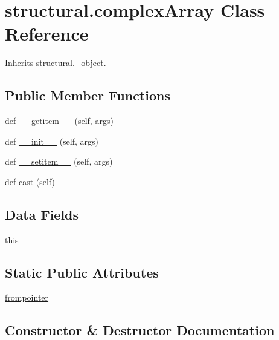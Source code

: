 \hypertarget{classstructural_1_1complex_array}{}\section{structural.\+complex\+Array Class Reference}
\label{classstructural_1_1complex_array}


Inherits \hyperlink{classstructural_1_1__object}{structural.\+\_\+object}.

\subsection*{Public Member Functions}
\begin{DoxyCompactItemize}
\item 
def \hyperlink{classstructural_1_1complex_array_aa254cc11b00b3e956fea29f172467343}{\+\_\+\+\_\+getitem\+\_\+\+\_\+} (self, args)
\item 
def \hyperlink{classstructural_1_1complex_array_abe89c0709788ca56b1add6f691149d94}{\+\_\+\+\_\+init\+\_\+\+\_\+} (self, args)
\item 
def \hyperlink{classstructural_1_1complex_array_affadd17e053da0aeb7282f4785c14961}{\+\_\+\+\_\+setitem\+\_\+\+\_\+} (self, args)
\item 
def \hyperlink{classstructural_1_1complex_array_a697d148cb156c5d2ddf83323dac45341}{cast} (self)
\end{DoxyCompactItemize}
\subsection*{Data Fields}
\begin{DoxyCompactItemize}
\item 
\hyperlink{classstructural_1_1complex_array_afce3a4cd43422f885ef2b15859715744}{this}
\end{DoxyCompactItemize}
\subsection*{Static Public Attributes}
\begin{DoxyCompactItemize}
\item 
\hyperlink{classstructural_1_1complex_array_a2f20eddfe4116e325ac5e9a5ae948feb}{frompointer}
\end{DoxyCompactItemize}


\subsection{Constructor \& Destructor Documentation}
\mbox{\label{classstructural_1_1complex_array_abe89c0709788ca56b1add6f691149d94}} 
